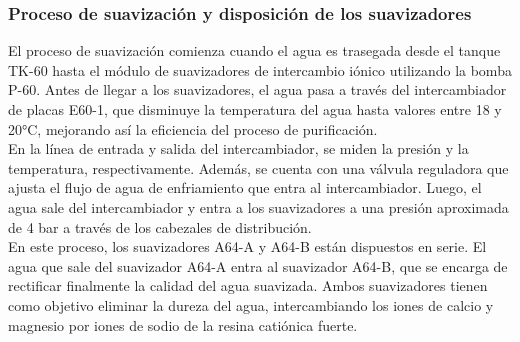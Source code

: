 
\subsubsection{Proceso de suavización y disposición de los suavizadores}

El proceso de suavización comienza cuando el agua es trasegada desde el tanque TK-60 hasta el módulo de suavizadores de intercambio iónico utilizando la bomba P-60. Antes de llegar a los suavizadores, el agua pasa a través del intercambiador de placas E60-1, que disminuye la temperatura del agua hasta valores entre 18 y 20°C, mejorando así la eficiencia del proceso de purificación.\\


En la línea de entrada y salida del intercambiador, se miden la presión y la temperatura, respectivamente. Además, se cuenta con una válvula reguladora que ajusta el flujo de agua de enfriamiento que entra al intercambiador. Luego, el agua sale del intercambiador y entra a los suavizadores a una presión aproximada de 4 bar a través de los cabezales de distribución.\\


En este proceso, los suavizadores A64-A y A64-B están dispuestos en serie. El agua que sale del suavizador A64-A entra al suavizador A64-B, que se encarga de rectificar finalmente la calidad del agua suavizada. Ambos suavizadores tienen como objetivo eliminar la dureza del agua, intercambiando los iones de calcio y magnesio por iones de sodio de la resina catiónica fuerte.\\
